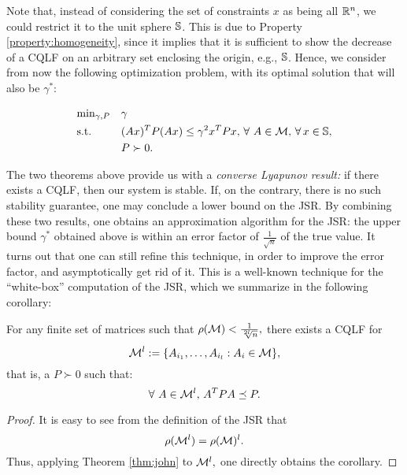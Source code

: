 
Note that, instead of considering the set of constraints $x$ as being all $\mathbb{R}^n$, we could restrict it to the unit sphere $\mathbb{S}$. This is due to Property \ref{property:homogeneity}, since it implies that it is sufficient to show the decrease of a CQLF on an arbitrary set enclosing the origin, e.g., $\mathbb{S}$. Hence, we consider from now the following optimization problem, with its optimal solution that will also be $\gamma^{*}$:

\begin{equation}\label{eqn:campiOpt1}
\begin{aligned}
& \text{min}_{\gamma, P} & & \gamma \\
& \text{s.t.} 
&  & (Ax)^TP(Ax) \leq \gamma^2 x^TPx,\,\forall\ A \in \mathcal{M}, \,\forall\, x \in \mathbb{S},\\
& && P \succ 0. \\
\end{aligned}
\end{equation}



The two theorems above provide us with a \emph{converse Lyapunov result:} if there exists a CQLF, then our system is stable. If, on the contrary, there is no such stability guarantee, one may conclude a lower bound on the JSR. By combining these two results, one obtains an approximation algorithm for the JSR: the upper bound $\gamma^*$ obtained above is within an error factor of $\frac{1}{\sqrt{n}}$ of the true value. It turns out that one can still refine this technique, in order to improve the error factor, and asymptotically get rid of it. This is a well-known technique for the ``white-box'' computation of the JSR, which we summarize in the following corollary:

\begin{corollary}\label{cor:approx-products}
For any finite set of matrices such that $\rho(\mathcal{M})<\frac{1}{\sqrt[2l]{n}},$ there exists a CQLF for $$\mathcal{M}^l:=\{A_{i_1},\dots, A_{i_{l}}:A_i\in\mathcal{M}\},$$ that is, a $P\succ 0$ such that: $$\forall\ A\in \mathcal{M}^l,\, A^TPA\preceq P. $$
\end{corollary}

\begin{proof}
It is easy to see from the definition of the JSR that $$\rho(\mathcal{M}^l)=\rho(\mathcal{M})^l.$$ Thus, applying Theorem \ref{thm:john} to $\mathcal{M}^l,$ one directly obtains the corollary.
\end{proof}


